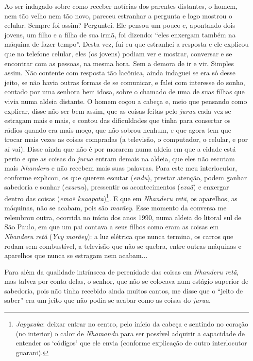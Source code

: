 Ao ser indagado sobre como receber notícias dos parentes distantes, o
homem, nem tão velho nem tão novo, pareceu estranhar a pergunta e logo
mostrou o celular. Sempre foi assim? Perguntei. Ele pensou um pouco e,
apontando dois jovens, um filho e a filha de sua irmã, foi dizendo:
``eles enxergam também na máquina de fazer tempo''. Desta vez, fui eu
que estranhei a resposta e ele explicou que no telefone celular, eles
(os jovens) podiam ver e mostrar, conversar e se encontrar com as
pessoas, na mesma hora. Sem a demora de ir e vir. Simples assim. Não
contente com resposta tão lacônica, ainda indaguei se era só desse
jeito, se não havia outras formas de se comunicar, e falei com interesse
do sonho, contado por uma senhora bem idosa, sobre o chamado de uma de
suas filhas que vivia numa aldeia distante. O homem coçou a cabeça e,
meio que pensando como explicar, disse não ser bem assim, que as coisas
feitas pelo \emph{jurua} cada vez se estragam mais e mais, e contou das
dificuldades que tinha para consertar os rádios quando era mais moço,
que não sobrou nenhum, e que agora tem que trocar mais vezes as coisas
compradas (a televisão, o computador, o celular, e por aí vai). Disse
ainda que não é por morarem numa aldeia em que a cidade está perto e que
as coisas do \emph{jurua} entram demais na aldeia, que eles não escutam
mais \emph{Nhanderu} e não recebem mais suas palavras. Para este meu
interlocutor, conforme explicou, os que querem escutar (\emph{endu}),
prestar atenção, podem ganhar sabedoria e sonhar (\emph{exarau}),
pressentir os acontecimentos (\emph{exaã}) e enxergar dentro das coisas
(\emph{emaẽ kuaapota})\footnote{\emph{Japyxaka}: deixar entrar no
  centro, pelo início da cabeça e sentindo no coração (no interior) o
  calor de \emph{Nhamandu} para ser possível adquirir a capacidade de
  entender os `códigos' que ele envia (conforme explicação de outro
  interlocutor guarani).}. E que em \emph{Nhanderu retã}, os aparelhos,
as máquinas, não se acabam, pois são \emph{marãey}. Esse momento da
conversa me relembrou outra, ocorrida no início dos anos 1990, numa
aldeia do litoral sul de São Paulo, em que um pai contava a seus filhos
como eram as coisas em \emph{Nhanderu retã} (\emph{Yvy marãey}): a luz
elétrica que nunca termina, os carros que rodam sem combustível, a
televisão que não se quebra, entre outras máquinas e aparelhos que nunca
se estragam nem acabam...

Para além da qualidade intrínseca de perenidade das coisas em
\emph{Nhanderu retã}, mas talvez por conta delas, o senhor, que não se
colocava num estágio superior de sabedoria, pois não tinha recebido
ainda muitos cantos, me disse que o ``jeito de saber'' era um jeito que
não podia se acabar como as coisas do \emph{jurua}.

